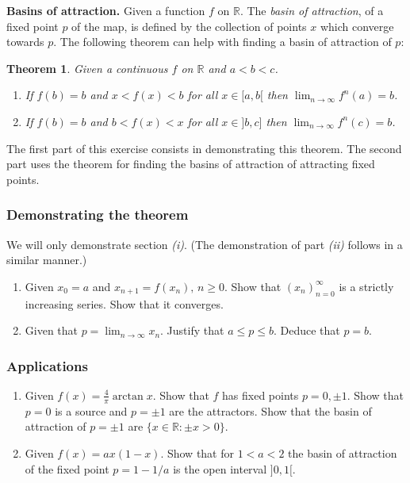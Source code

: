 \documentclass{article}
\newtheorem{theorem}{Theorem}
\begin{document}
\begin{question}
  \textbf{Basins of attraction.} Given a function $f$ on $\mathbb R$. The \textit{basin of attraction}, of a fixed point $p$ of the map, is defined by the collection of points $x$ which converge towards $p$. The following theorem can help with finding a basin of attraction of $p$:
  \begin{theorem}
    Given a continuous $f$ on $\mathbb R$ and $a<b<c$.
    \begin{enumerate}[label=(\roman*)]
      \item If $f(b)=b$ and $x<f(x)<b$ for all $x\in [a,b[$ then $\lim_{n\to \infty}f^n(a) = b$.
      \item If $f(b)=b$ and $b<f(x)<x$ for all $x\in ]b,c]$ then $\lim_{n\to \infty}f^n(c) = b$.
    \end{enumerate}
  \end{theorem}
  \noindent The first part of this exercise consists in demonstrating this theorem. The second part uses the theorem for finding the basins of attraction of attracting fixed points.
  \subsubsection*{Demonstrating the theorem}
  \noindent We will only demonstrate section \textit{(i)}. (The demonstration of part \textit{(ii)} follows in a similar manner.)
  \begin{enumerate}[label=(\alph*)]
    \item Given $x_0=a$ and $x_{n+1} = f(x_n),\,n\geqslant 0$. Show that $(x_n)_{n=0}^\infty$ is a strictly increasing series. Show that it converges.
    \item Given that $p=\lim_{n\to \infty} x_n$. Justify that $a\leqslant p \leqslant b$. Deduce that $p=b$.
  \end{enumerate}
  \subsubsection*{Applications}
   \begin{enumerate}[label=(\alph*),resume]
    \item Given $f(x) = \frac{4}{\pi}\arctan x$. Show that $f$ has fixed points $p=0,\pm 1$. Show that $p=0$ is a source and $p=\pm 1$ are the attractors. Show that the basin of attraction of $p=\pm 1$ are $\{x\in \mathbb R:\pm x > 0\}$.
    \item Given $f(x) = a x(1-x)$. Show that for $1 < a < 2$ the basin of attraction of the fixed point $p=1-1/a$ is the open interval $]0,1[$.
  \end{enumerate}
\end{question}
  
\end{document}

